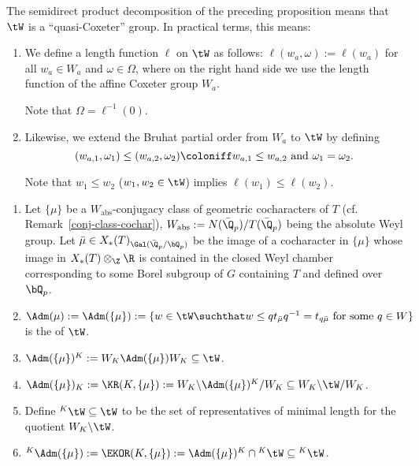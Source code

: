 \documentclass[a4paper]{scrartcl} %
\numberwithin{equation}{section}
\begin{document}
\begin{Definition}
  The semidirect product decomposition of the preceding proposition means that $\tW$ is a ``quasi-Coxeter'' group. In practical terms, this means:
  
  \begin{enumerate}[(1)]
  \item We define a length function $\ell$ on $\tW$ as follows: $\ell(w_a,\omega):=\ell(w_a)$ for all $w_a\in W_a$ and $\omega\in\Omega$, where on the right hand side we use the length function of the affine Coxeter group $W_a$.

    Note that $\Omega=\ell^{-1}(0)$.
  \item Likewise, we extend the Bruhat partial order from $W_a$ to $\tW$ by defining
    \begin{equation*}
      (w_{a,1},\omega_1) \leq (w_{a,2},\omega_2) \coloniff w_{a,1}\leq w_{a,2}\text{ and } \omega_1=\omega_2.
    \end{equation*}

    Note that $w_1\leq w_2$ ($w_1,w_2\in\tW$) implies $\ell(w_1)\leq\ell(w_2)$.
  \end{enumerate}
\end{Definition}


\begin{Definition}
  \begin{enumerate}[(1)]
  \item Let $\{\mu\}$ be a $W_\mathrm{abs}$-conjugacy class  of geometric cocharacters of $T$ (cf. Remark~\ref{conj-class-cochar}), $W_\mathrm{abs}:=N(\bar\Q_p)/T(\bar\Q_p)$ being the absolute Weyl group. Let $\bar\mu\in X_*(T)_{\Gal(\bar\Q_p/\bQ_p)}$ be the image of a cocharacter in $\{\mu\}$ whose image in $X_*(T)\otimes_\Z\R$ is contained in the closed Weyl chamber corresponding to some Borel subgroup of $G$ containing $T$ and defined over $\bQ_p$.
  \item $\Adm(\mu):=\Adm(\{\mu\}):=\{w\in\tW\suchthat w \leq q t_{\bar\mu}q^{-1}=t_{q\bar\mu}\text{ for some } q\in W\}$ is the  of $\tW$.
  \item $\Adm(\{\mu\})^K:= W_K\Adm(\{\mu\})W_K\subseteq \tW$.
  \item $\Adm(\{\mu\})_K:=\KR(K,\{\mu\}):=W_K\backslash \Adm(\{\mu\})^K/W_K\subseteq W_K\backslash \tW/W_K$.
  \item Define $^K\tW\subseteq\tW$ to be the set of representatives of minimal length for the quotient $W_K\backslash \tW$.
  \item $^K\Adm(\{\mu\}):=\EKOR(K,\{\mu\}):=\Adm(\{\mu\})^K\cap {}^K\tW\subseteq {}^K\tW$.
  \end{enumerate}
\end{Definition}
\end{document}
